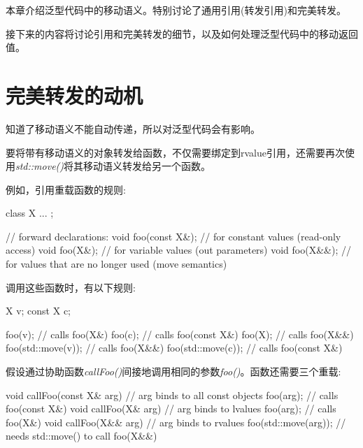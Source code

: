 
本章介绍泛型代码中的移动语义。特别讨论了通用引用(转发引用)和完美转发。\par

接下来的内容将讨论引用和完美转发的细节，以及如何处理泛型代码中的移动返回值。\par


\section{完美转发的动机}

知道了移动语义不能自动传递，所以对泛型代码会有影响。\par


要将带有移动语义的对象转发给函数，不仅需要绑定到rvalue引用，还需要再次使用\textit{std::move()}将其移动语义转发给另一个函数。\par

例如，引用重载函数的规则:\par

\begin{codebox}[cpp]
class X {
  ...
};

// forward declarations:
void foo(const X&); // for constant values (read-only access)
void foo(X&); // for variable values (out parameters)
void foo(X&&); // for values that are no longer used (move semantics)
\end{codebox}

调用这些函数时，有以下规则:\par

\begin{codebox}[cpp]
X v;
const X c;

foo(v); // calls foo(X&)
foo(c); // calls foo(const X&)
foo(X{}); // calls foo(X&&)
foo(std::move(v)); // calls foo(X&&)
foo(std::move(c)); // calls foo(const X&)
\end{codebox}

假设通过协助函数\textit{callFoo()}间接地调用相同的参数\textit{foo()}。函数还需要三个重载:\par

\begin{codebox}[cpp]
void callFoo(const X& arg) { // arg binds to all const objects
  foo(arg); // calls foo(const X&)
}
void callFoo(X& arg) { // arg binds to lvalues
  foo(arg); // calls foo(X&)
}
void callFoo(X&& arg) { // arg binds to rvalues
  foo(std::move(arg)); // needs std::move() to call foo(X&&)
}
\end{codebox}

